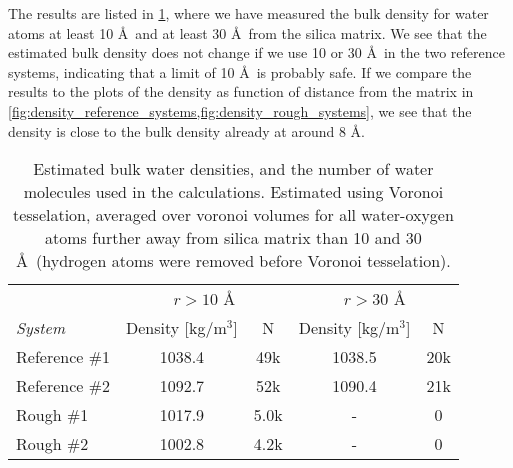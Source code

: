 The results are listed in \cref{tab:bulk_water_density}, where we have measured the bulk density for water atoms at least 10 \AA\ and at least 30 \AA\ from the silica matrix. We see that the estimated bulk density does not change if we use 10 or 30 \AA\ in the two reference systems, indicating that a limit of 10 \AA\ is probably safe. If we compare the results to the plots of the density as function of distance from the matrix in \cref{fig:density_reference_systems,fig:density_rough_systems}, we see that the density is close to the bulk density already at around 8 \AA.
%
\begin{table}[!htb]%
    \centering%
    \begin{tabular}{l|cc|cc}%
    ~               & \multicolumn{2}{c|}{$r>10$ \AA}& \multicolumn{2}{c}{$r>30$ \AA}    \\
    \textit{System} & Density [kg/m$^3$]    & N     & Density [kg/m$^3$]    & N   \\ \hline
    Reference \#1   & 1038.4                & 49k   & 1038.5                & 20k \\
    Reference \#2   & 1092.7                & 52k   & 1090.4                & 21k \\
    Rough \#1       & 1017.9                & 5.0k  & -                     & 0   \\
    Rough \#2       & 1002.8                & 4.2k  & -                     & 0   \\
    \end{tabular}%
    \vspace{8pt}%
    \caption{%
        Estimated bulk water densities, and the number of water molecules used in the calculations. Estimated using Voronoi tesselation, averaged over voronoi volumes for all water-oxygen atoms further away from silica matrix than 10 and 30 \AA\ (hydrogen atoms were removed before Voronoi tesselation). %
        \label{tab:bulk_water_density}%
    }%
\end{table}%
